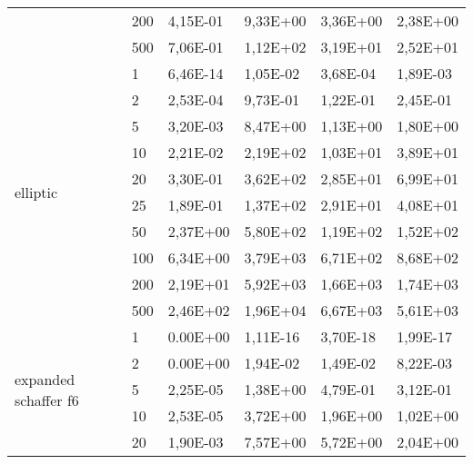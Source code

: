 \begin{longtable}[c]{|p{3.5cm}|l|l|l|l|l|}
                                        & 200       & 4,15E-01   & 9,33E+00   & 3,36E+00   & 2,38E+00  \\ \cline{2-6} 
                                        & 500       & 7,06E-01   & 1,12E+02   & 3,19E+01   & 2,52E+01  \\ \hline
\multirow[t]{10}{*}{elliptic}              & 1         & 6,46E-14   & 1,05E-02   & 3,68E-04   & 1,89E-03  \\ \cline{2-6} 
                                        & 2         & 2,53E-04   & 9,73E-01   & 1,22E-01   & 2,45E-01  \\ \cline{2-6} 
                                        & 5         & 3,20E-03   & 8,47E+00   & 1,13E+00   & 1,80E+00  \\ \cline{2-6} 
                                        & 10        & 2,21E-02   & 2,19E+02   & 1,03E+01   & 3,89E+01  \\ \cline{2-6} 
                                        & 20        & 3,30E-01   & 3,62E+02   & 2,85E+01   & 6,99E+01  \\ \cline{2-6} 
                                        & 25        & 1,89E-01   & 1,37E+02   & 2,91E+01   & 4,08E+01  \\ \cline{2-6} 
                                        & 50        & 2,37E+00   & 5,80E+02   & 1,19E+02   & 1,52E+02  \\ \cline{2-6} 
                                        & 100       & 6,34E+00   & 3,79E+03   & 6,71E+02   & 8,68E+02  \\ \cline{2-6} 
                                        & 200       & 2,19E+01   & 5,92E+03   & 1,66E+03   & 1,74E+03  \\ \cline{2-6} 
                                        & 500       & 2,46E+02   & 1,96E+04   & 6,67E+03   & 5,61E+03  \\ \hline
\multirow[t]{10}{*}{expanded schaffer f6}  & 1         & 0.00E+00   & 1,11E-16   & 3,70E-18   & 1,99E-17  \\ \cline{2-6} 
                                        & 2         & 0.00E+00   & 1,94E-02   & 1,49E-02   & 8,22E-03  \\ \cline{2-6} 
                                        & 5         & 2,25E-05   & 1,38E+00   & 4,79E-01   & 3,12E-01  \\ \cline{2-6} 
                                        & 10        & 2,53E-05   & 3,72E+00   & 1,96E+00   & 1,02E+00  \\ \cline{2-6} 
                                        & 20        & 1,90E-03   & 7,57E+00   & 5,72E+00   & 2,04E+00  \\ \cline{2-6} 

\end{longtable}
